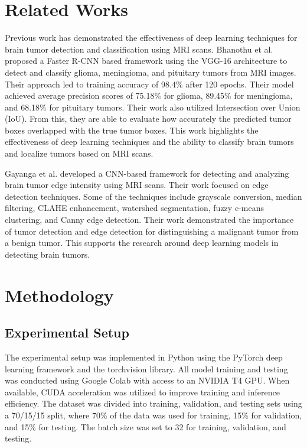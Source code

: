 \documentclass[conference]{IEEEtran}
\begin{document}
\section{Related Works}
Previous work has demonstrated the effectiveness of deep learning techniques for brain tumor detection and classification using MRI scans. Bhanothu et al. proposed a Faster R-CNN based framework using the VGG-16 architecture to detect and classify glioma, meningioma, and pituitary tumors from MRI images. Their approach led to training accuracy of 98.4\% after 120 epochs. Their model achieved average precision scores of 75.18\% for glioma, 89.45\% for meningioma, and 68.18\% for pituitary tumors. Their work also utilized Intersection over Union (IoU). From this, they are able to evaluate how accurately the predicted tumor boxes overlapped with the true tumor boxes. This work highlights the effectiveness of deep learning techniques and the ability to classify brain tumors and localize tumors based on MRI scans. \cite{bhanothu2020}

Gayanga et al. developed a CNN-based framework for detecting and analyzing brain tumor edge intensity using MRI scans. Their work focused on edge detection techniques. Some of the techniques include grayscale conversion, median filtering, CLAHE enhancement, watershed segmentation, fuzzy c-means clustering, and Canny edge detection. Their work demonstrated the importance of tumor detection and edge detection for distinguishing a malignant tumor from a benign tumor. This supports the research around deep learning models in detecting brain tumors. \cite{gayanga2019}


\section{Methodology}

\subsection{Experimental Setup}
The experimental setup was implemented in Python using the PyTorch deep learning framework and the torchvision library. All model training and testing was conducted using Google Colab with access to an NVIDIA T4 GPU. When available, CUDA acceleration was utilized to improve training and inference efficiency. The dataset was divided into training, validation, and testing sets using a 70/15/15 split, where 70\% of the data was used for training, 15\% for validation, and 15\% for testing. The batch size was set to 32 for training, validation, and testing.
\end{document}
